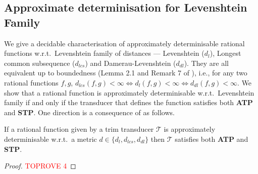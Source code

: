 \documentclass[a4paper,UKenglish,cleveref, autoref, thm-restate,authorcolumns, colorlinks]{lipics-v2021}
\newcommand\calT{\mathcal{T}}
\newcommand{\dlev}{\ensuremath{d_l}}
\newcommand{\ATP}[0]{\textbf{ATP}}
\newcommand{\STP}[0]{\textbf{STP}}
\begin{document}
\subsection{Approximate determinisation for Levenshtein Family}\label{subsec:lev}
We give a decidable characterisation of approximately determinisable rational functions w.r.t.~Levenshtein family of distances --- Levenshtein ($\dlev$), Longest common subsequence ($d_{lcs}$) and Damerau-Levenshtein ($d_{dl}$). They are all equivalent up to boundedness (Lemma 2.1 and Remark 7 of \cite{editdistance}), i.e., for any two rational functions $f,g$, $d_{lcs}(f,g) < \infty \iff \dlev(f,g) < \infty \iff d_{dl}(f,g) < \infty.$ We show that a rational function is approximately determinisable w.r.t.~Levenshtein family if and only if the transducer that defines the function satisfies both \ATP{} and \STP{}. One direction is a consequence of  as follows.

\begin{proposition}\label{proposition:approxtoATPSTP}
   If a rational function given by a trim transducer $\calT$ is approximately determinisable w.r.t.~a metric $d \in \{d_l,d_{lcs},d_{dl}\}$ then $\calT$ satisfies both \ATP{} and \STP{}.
\end{proposition}
\begin{proof}\textcolor{red}{TOPROVE 4}\end{proof}
\end{document}
